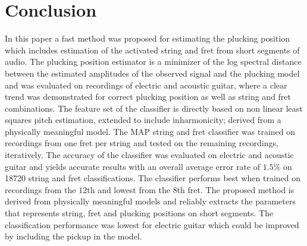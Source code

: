 \documentclass{article}
\begin{document}
\section{Conclusion} 
\label{sec:conclusion}
In this paper a fast method was proposed for estimating the plucking position which includes estimation of the activated string and fret from short segments of audio. The plucking position estimator is a minimizer of the log spectral distance between the estimated amplitudes of the observed signal and the plucking model and was evaluated on recordings of electric and acoustic guitar, where a clear trend was demonstrated for correct plucking position as well as string and fret combinations. The feature set of the classifier is directly based on non linear least squares pitch estimation, extended to include inharmonicity; derived from a physically meaningful model. The MAP string and fret classifier was trained on recordings from one fret per string and tested on the remaining recordings, iteratively. The accuracy of the classifier was evaluated on electric and acoustic guitar and yields accurate results with an overall average error rate of $1.5\%$ on 18720 string and fret classifications. The classifier performs best when trained on recordings from the $12$th and lowest from the $8$th fret. The proposed method is derived from physically meaningful models and reliably extracts the parameters that represents string, fret and plucking positions on short segments. The classification performance was lowest for electric guitar which could be improved by including the pickup in the model. 
%
%
%
%
%
\vfill\pagebreak

%

\end{document}
